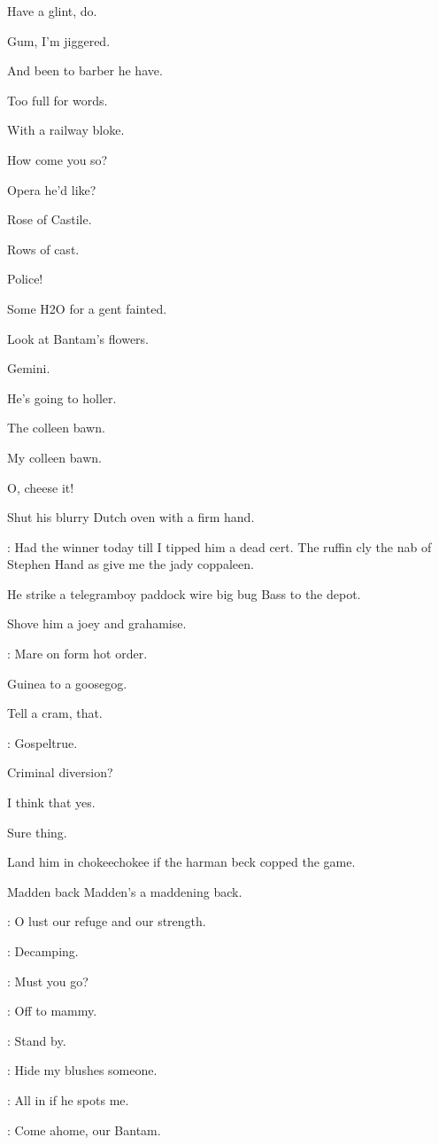 \documentclass[12pt]{article}
\begin{document}
Have a glint, do.

Gum, I'm jiggered.

And been to barber he have.

Too full for words.

With a railway bloke.

How come you so?

Opera he'd like?

Rose of Castile.

Rows of cast.

Police!

Some H2O for a gent fainted.

Look at Bantam's flowers.

Gemini.

He's going to holler.

The colleen bawn.

My colleen bawn.

O, cheese it!

Shut his blurry Dutch oven with a firm hand.

\Ln: Had the winner today till I tipped him a dead cert.
The ruffin cly the nab of Stephen Hand as give me the jady coppaleen.

He strike a telegramboy paddock wire big bug Bass to the depot.

Shove him a joey and grahamise.

\Ln: Mare on form hot order.

Guinea to a goosegog.

Tell a cram, that.

\Ln: Gospeltrue.

Criminal diversion?

I think that yes.

Sure thing.

Land him in chokeechokee if the harman beck copped the game.

Madden back Madden's a maddening back.

\Ly: O lust our refuge and our strength.

\Md: Decamping.

\Ba: Must you go?

\Md: Off to mammy.

\Dx: Stand by.

\Md: Hide my blushes someone.


\Bl: All in if he spots me.

\PC: Come ahome, our Bantam.
\end{document}
